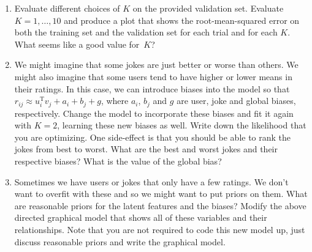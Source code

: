 \documentclass[10pt]{harvardml}
\theoremstyle{plain}
\begin{document}
\begin{problem}
\begin{enumerate}[label=(\alph*)]
\item Evaluate different choices of $K$ on the provided validation set. Evaluate $K = 1,
\ldots, 10$ and produce a plot that shows the root-mean-squared error on both
the training set and the validation set for each trial and for each $K$. What
seems like a good value for~$K$?

 \item We might imagine that some jokes are just better or worse than others.
We might also imagine that some users tend to have higher or lower means in
their ratings. In this case, we can introduce biases into the model so that
$r_{ij} \approx u_i^\text{T} v_j + a_i + b_j + g$, where $a_i$, $b_j$ and $g$ are user,
joke and global biases, respectively.  Change the model to incorporate these
biases and fit it again with $K=2$, learning these new biases as well. Write
down the likelihood that you are optimizing. One side-effect is that you should
be able to rank the jokes from best to worst. What are the best and worst jokes
and their respective biases?  What is the value of the global bias?

 \item Sometimes we have users or jokes that only have a few ratings. We don't
want to overfit with these and so we might want to put priors on them. What are
reasonable priors for the latent features and the biases? Modify the above directed
graphical model that shows all of these variables and their relationships.
Note that you are not required to code this new model up, just discuss
reasonable priors and write the graphical model.


\end{enumerate}
\end{problem}
\end{document}
